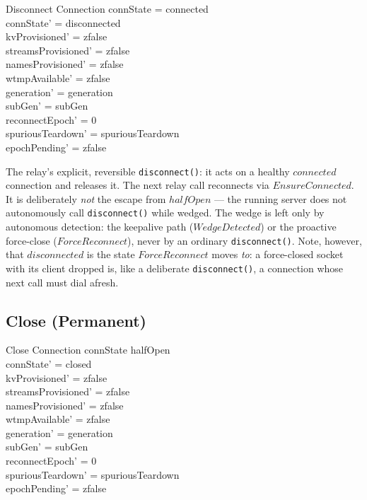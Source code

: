 \documentclass[a4paper,10pt,fleqn]{article}
\begin{document}
\begin{schema}{Disconnect}
  \Delta Connection
  \where
  connState = connected \\
  connState' = disconnected \\
  kvProvisioned' = zfalse \\
  streamsProvisioned' = zfalse \\
  namesProvisioned' = zfalse \\
  wtmpAvailable' = zfalse \\
  generation' = generation \\
  subGen' = subGen \\
  reconnectEpoch' = 0 \\
  spuriousTeardown' = spuriousTeardown \\
  epochPending' = zfalse
\end{schema}

The relay's explicit, reversible \texttt{disconnect()}: it acts
on a healthy $connected$ connection and releases it.  The next
relay call reconnects via $EnsureConnected$.  It is deliberately
\emph{not} the escape from $halfOpen$ --- the running server does
not autonomously call \texttt{disconnect()} while wedged.  The
wedge is left only by autonomous detection: the keepalive path
($WedgeDetected$) or the proactive force-close ($ForceReconnect$),
never by an ordinary \texttt{disconnect()}.  Note, however, that
$disconnected$ is the state $ForceReconnect$ moves \emph{to}: a
force-closed socket with its client dropped is, like a deliberate
\texttt{disconnect()}, a connection whose next call must dial
afresh.

\subsection{Close (Permanent)}

\begin{schema}{Close}
  \Delta Connection
  \where
  connState \neq halfOpen \\
  connState' = closed \\
  kvProvisioned' = zfalse \\
  streamsProvisioned' = zfalse \\
  namesProvisioned' = zfalse \\
  wtmpAvailable' = zfalse \\
  generation' = generation \\
  subGen' = subGen \\
  reconnectEpoch' = 0 \\
  spuriousTeardown' = spuriousTeardown \\
  epochPending' = zfalse
\end{schema}
\end{document}
